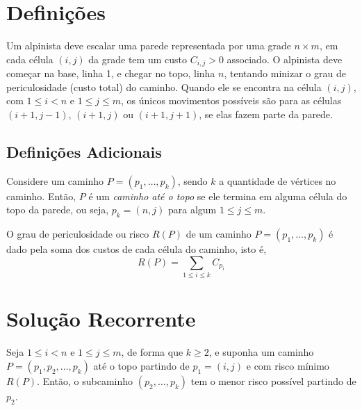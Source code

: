 \section{Definições}

Um alpinista deve escalar uma parede representada por uma grade $n \times m$, em cada célula $(i, j)$ da grade tem um custo $C_{i, j} > 0$ associado. O alpinista deve começar na base, linha 1, e chegar no topo, linha $n$, tentando minizar o grau de periculosidade (custo total) do caminho. Quando ele se encontra na célula $(i, j)$, com $1 \leq i < n$ e $1 \leq j \leq m$, os únicos movimentos possíveis são para as células $(i+1, j-1)$, $(i+1, j)$ ou $(i+1, j+1)$, se elas fazem parte da parede.

\subsection{Definições Adicionais}

\begin{definition}
    Considere um caminho $P = \left(p_1, \ldots, p_k\right)$, sendo $k$ a quantidade de vértices no caminho. Então, $P$ é um \textit{caminho até o topo} se ele termina em alguma célula do topo da parede, ou seja, $p_k = (n, j)$ para algum $1 \leq j \leq m$.
\end{definition}

\begin{definition}[Risco]
    O grau de periculosidade ou risco $R(P)$ de um caminho $P = \left(p_1, \ldots, p_k\right)$ é dado pela soma dos custos de cada célula do caminho, isto é,
    \[
        R(P) = \sum_{1 \leq i \leq k} C_{p_i}
    \]
\end{definition}

\section{Solução Recorrente}

\begin{theorem}
    Seja $1 \leq i < n$ e $1 \leq j \leq m$, de forma que $k \geq 2$, e suponha um caminho $P = \left(p_1, p_2, \ldots, p_k\right)$ até o topo partindo de $p_1 = (i, j)$ e com risco mínimo $R(P)$. Então, o subcaminho $\left(p_2, \ldots, p_k\right)$ tem o menor risco possível partindo de $p_2$.
\end{theorem}

